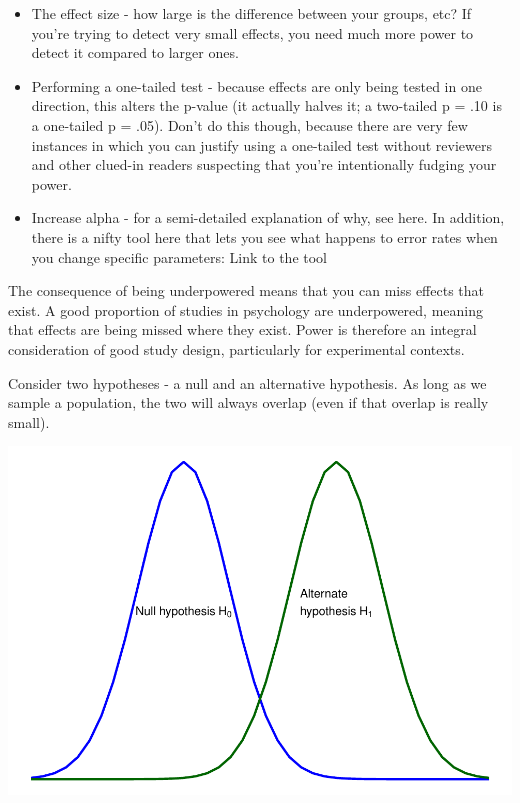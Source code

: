 \documentclass[
]{book}
\providecommand{\tightlist}{%
  \setlength{\itemsep}{0pt}\setlength{\parskip}{0pt}}
\begin{document}
\begin{itemize}
\tightlist
\item
  The effect size - how large is the difference between your groups, etc? If you're trying to detect very small effects, you need much more power to detect it compared to larger ones.
\item
  Performing a one-tailed test - because effects are only being tested in one direction, this alters the p-value (it actually halves it; a two-tailed p = .10 is a one-tailed p = .05). Don't do this though, because there are very few instances in which you can justify using a one-tailed test without reviewers and other clued-in readers suspecting that you're intentionally fudging your power.
\item
  Increase alpha - for a semi-detailed explanation of why, see here. In addition, there is a nifty tool here that lets you see what happens to error rates when you change specific parameters: Link to the tool
\end{itemize}

The consequence of being underpowered means that you can miss effects that exist. A good proportion of studies in psychology are underpowered, meaning that effects are being missed where they exist. Power is therefore an integral consideration of good study design, particularly for experimental contexts.

Consider two hypotheses - a null and an alternative hypothesis. As long as we sample a population, the two will always overlap (even if that overlap is really small).

\includegraphics{_main_files/figure-latex/unnamed-chunk-81-1.pdf}
\end{document}
